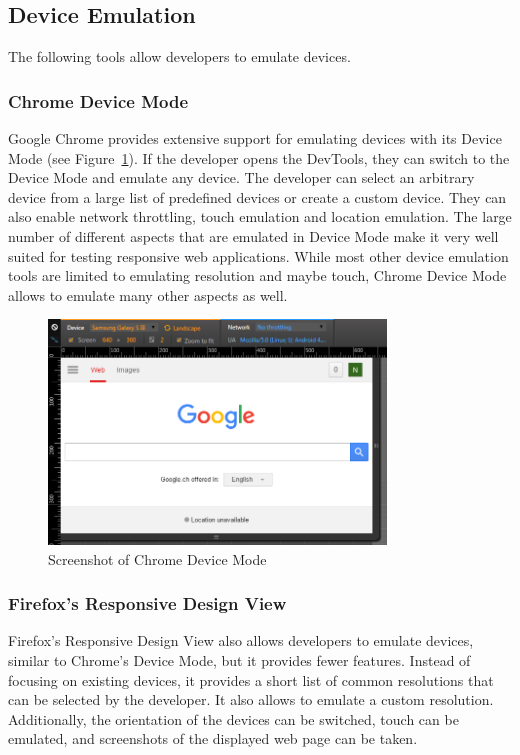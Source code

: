 \subsection{Device Emulation}

The following tools allow developers to emulate devices. 

\subsubsection{Chrome Device Mode}

Google Chrome provides extensive support for emulating devices with its Device Mode (see Figure~\ref{fig:device_mode}). If the developer opens the DevTools, they can switch to the Device Mode and emulate any device. The developer can select an arbitrary device from a large list of predefined devices or create a custom device. They can also enable network throttling, touch emulation and location emulation. The large number of different aspects that are emulated in Device Mode make it very well suited for testing responsive web applications. While most other device emulation tools are limited to emulating resolution and maybe touch, Chrome Device Mode allows to emulate many other aspects as well.

\begin{figure}[H]
  \centering
    \includegraphics[width=0.8\textwidth]{images/relatedwork/device_mode_2.png}
	\caption[Screenshot: Chrome Device Mode]{Screenshot of Chrome Device Mode}
	\label{fig:device_mode}
\end{figure}

\subsubsection{Firefox's Responsive Design View}

Firefox's Responsive Design View also allows developers to emulate devices, similar to Chrome's Device Mode, but it provides fewer features. Instead of focusing on existing devices, it provides a short list of common resolutions that can be selected by the developer. It also allows to emulate a custom resolution. Additionally, the orientation of the devices can be switched, touch can be emulated, and screenshots of the displayed web page can be taken.


